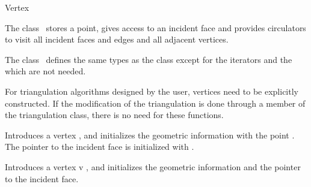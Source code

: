 

\begin{ccRefClass}{Vertex}  %


\ccDefinition
  
The class \ccRefName\ stores a point, gives access to an incident face
and provides circulators to visit all incident faces and edges
and all adjacent vertices.





\ccTypes
The class \ccRefName\ defines the same types 
as the class  
except for the iterators and the 
 which are not needed.

\begin{ccAdvanced}
\ccCreation

For triangulation algorithms designed by the user, vertices need to be
explicitly constructed.  If the modification of the triangulation is
done through a member of the triangulation class, there is no need for these
functions.


{Introduces a vertex \ccVar, and initializes the geometric information
with the point .
The pointer to the incident face is initialized with .}

{Introduces a vertex v \ccVar, and initializes the geometric information and 
the pointer to the incident face.}
\end{ccAdvanced}


\end{ccRefClass}
